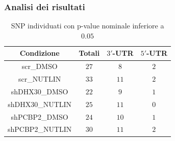 \documentclass[aspectration=1610]{beamer}
\DeclareRobustCommand{\#}{\adjustbox{valign=B,totalheight=.57\baselineskip}{\oldhash}}
\begin{document}
	\begin{frame}
		\frametitle{Analisi dei risultati}
		\begin{table}[H]
			\begin{tabular}{|c|c|c|c|}
				\hline
				Condizione & Totali & $3'$-UTR & $5'$-UTR\\
				\hline
				scr\_DMSO & $27$ & $8$ & $2$\\
				\hline
				scr\_NUTLIN & $33$ & $11$ &$2$\\
				\hline
				shDHX30\_DMSO & $22$ & $9$ & $1$\\
				\hline
				shDHX30\_NUTLIN & $25$ & $11$ & $0$\\
				\hline
				shPCBP2\_DMSO & $24$ & $10$ & $1$\\
				\hline
				shPCBP2\_NUTLIN & $30$ & $11$ & $2$\\
				\hline
			\end{tabular}
			\caption{SNP individuati con p-value nominale inferiore a $0.05$}
		\end{table}
	\end{frame}
\end{document}
